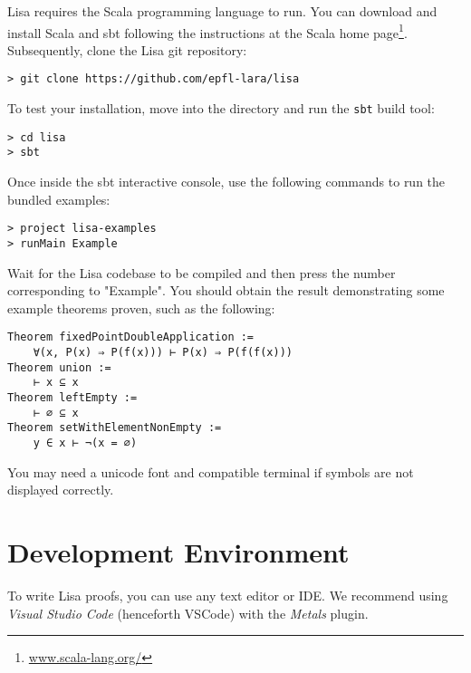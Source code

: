 Lisa requires the Scala programming language to run. You can download and
install Scala and sbt following the instructions at the Scala home
page\footnote{\url{www.scala-lang.org/}}. Subsequently, clone the Lisa git
repository:
%
\begin{lstlisting}[language=console]
> git clone https://github.com/epfl-lara/lisa
\end{lstlisting}
%
To test your installation, move into the directory and run the \lstinline|sbt|
build tool:
%
\begin{lstlisting}[language=console]
> cd lisa
> sbt
\end{lstlisting}
%
Once inside the sbt interactive console, use the following commands to run the
bundled examples:
%
\begin{lstlisting}[language=console]
> project lisa-examples
> runMain Example
\end{lstlisting}
Wait for the Lisa codebase to be compiled and then press the number
corresponding to "Example". You should obtain the result demonstrating some
example theorems proven, such as the following:

\noindent
\begin{minipage}{\linewidth}\vspace{1em}
\begin{lstlisting}[language=console]
Theorem fixedPointDoubleApplication :=
    ∀(x, P(x) ⇒ P(f(x))) ⊢ P(x) ⇒ P(f(f(x)))
Theorem union :=
    ⊢ x ⊆ x
Theorem leftEmpty :=
    ⊢ ∅ ⊆ x
Theorem setWithElementNonEmpty :=
    y ∈ x ⊢ ¬(x = ∅)
\end{lstlisting}
\end{minipage}

You may need a unicode font and compatible terminal if symbols are not displayed
correctly.

\section{Development Environment}
To write Lisa proofs, you can use any text editor or IDE. We recommend using \emph{Visual Studio Code} (henceforth VSCode) with the \emph{Metals} plugin.

